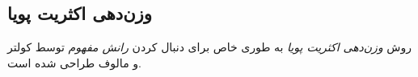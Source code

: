 \documentclass[a4paper,11px]{article}
\newcommand{\basepath}{../}
\begin{document}
\subsection{
وزن‌دهی اکثریت پویا
}
روش 
\textit{
وزن‌دهی اکثریت پویا
} 
به طوری خاص برای دنبال کردن 
\textit{
رانش مفهوم
} 
توسط کولتر و مالوف
\cite{koltermaloof2003} 
طراحی شده است. 







% 
\end{document}
